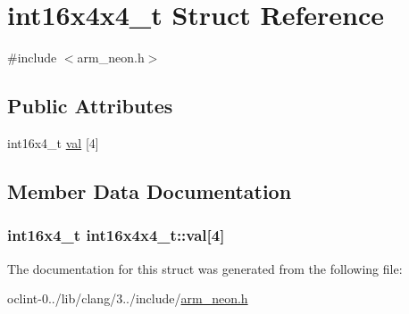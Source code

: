 \hypertarget{structint16x4x4__t}{\section{int16x4x4\-\_\-t Struct Reference}
\label{structint16x4x4__t}
}


{\ttfamily \#include $<$arm\-\_\-neon.\-h$>$}

\subsection*{Public Attributes}
\begin{DoxyCompactItemize}
\item 
int16x4\-\_\-t \hyperlink{structint16x4x4__t_a8de5a8a73863b7e18e34273b26902bc1}{val} \mbox{[}4\mbox{]}
\end{DoxyCompactItemize}


\subsection{Member Data Documentation}
\hypertarget{structint16x4x4__t_a8de5a8a73863b7e18e34273b26902bc1}{
\subsubsection[{val}]{\setlength{\rightskip}{0pt plus 5cm}int16x4\-\_\-t int16x4x4\-\_\-t\-::val\mbox{[}4\mbox{]}}}\label{structint16x4x4__t_a8de5a8a73863b7e18e34273b26902bc1}


The documentation for this struct was generated from the following file\-:\begin{DoxyCompactItemize}
\item 
oclint-\/0../lib/clang/3../include/\hyperlink{arm__neon_8h}{arm\-\_\-neon.\-h}\end{DoxyCompactItemize}
